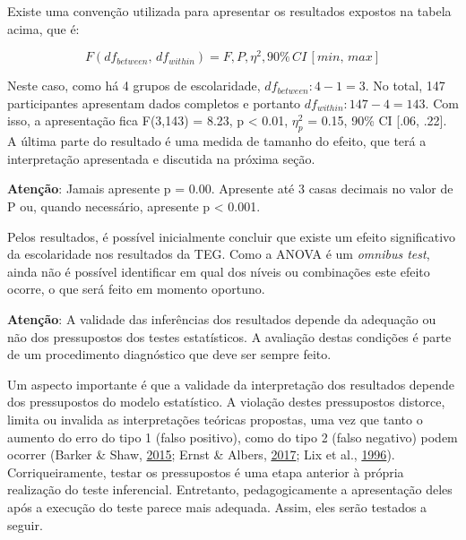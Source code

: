 \documentclass[
]{book}
\begin{document}
Existe uma convenção utilizada para apresentar os resultados expostos na
tabela acima, que é:

\[F(df_{between}, \, df_{within}) = F, P, \eta^2, 90\% \,CI \, [min, \, max]\]

Neste caso, como há 4 grupos de escolaridade, \(df_{between}: 4-1=3\).
No total, 147 participantes apresentam dados completos e portanto
\(df_{within}: 147-4 = 143\). Com isso, a apresentação fica F(3,143) =
8.23, p \textless{} 0.01, \(\eta_p^2\) = 0.15, 90\% CI {[}.06, .22{]}. A
última parte do resultado é uma medida de tamanho do efeito, que terá a
interpretação apresentada e discutida na próxima seção.

\begin{warning}

\textbf{Atenção}: Jamais apresente p = 0.00. Apresente até 3 casas
decimais no valor de P ou, quando necessário, apresente p \textless{}
0.001.

\end{warning}

Pelos resultados, é possível inicialmente concluir que existe um efeito
significativo da escolaridade nos resultados da TEG. Como a ANOVA é um
\emph{omnibus test}, ainda não é possível identificar em qual dos níveis
ou combinações este efeito ocorre, o que será feito em momento oportuno.

\begin{warning}

\textbf{Atenção}: A validade das inferências dos resultados depende da
adequação ou não dos pressupostos dos testes estatísticos. A avaliação
destas condições é parte de um procedimento diagnóstico que deve ser
sempre feito.

\end{warning}

Um aspecto importante é que a validade da interpretação dos resultados
depende dos pressupostos do modelo estatístico. A violação destes
pressupostos distorce, limita ou invalida as interpretações teóricas
propostas, uma vez que tanto o aumento do erro do tipo 1 (falso
positivo), como do tipo 2 (falso negativo) podem ocorrer (Barker \&
Shaw, \protect\hyperlink{ref-Barker2015}{2015}; Ernst \& Albers,
\protect\hyperlink{ref-Ernst2017}{2017}; Lix et al.,
\protect\hyperlink{ref-Lix1996}{1996}). Corriqueiramente, testar os
pressupostos é uma etapa anterior à própria realização do teste
inferencial. Entretanto, pedagogicamente a apresentação deles após a
execução do teste parece mais adequada. Assim, eles serão testados a
seguir.
\end{document}
